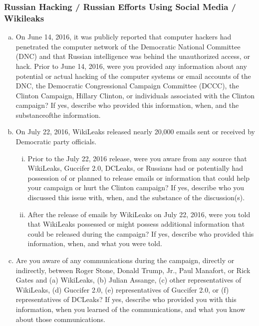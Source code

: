 \subsubsection{Russian Hacking / Russian Efforts Using Social Media / Wikileaks}

\begin{enumerate}[a.]

\item On June 14, 2016, it was publicly reported that computer hackers had penetrated the computer network of the Democratic National Committee (DNC) and that Russian intelligence was behind the unauthorized access, or hack.
Prior to June 14, 2016, were you provided any information about any potential or actual hacking of the computer systems or email accounts of the DNC, the Democratic Congressional Campaign Committee (DCCC), the Clinton Campaign, Hillary Clinton, or individuals associated with the Clinton campaign?
If yes, describe who provided this information, when, and the substanceofthe information.

\item On July 22, 2016, WikiLeaks released nearly 20,000 emails sent or received by Democratic party officials.

\begin{enumerate}[i.]

\item Prior to the July 22, 2016 release, were you aware from any source that WikiLeaks, Guccifer 2.0, DCLeaks, or Russians had or potentially had possession of or planned to release emails or information that could help your campaign or hurt the Clinton campaign?
If yes, describe who you discussed this issue with, when, and the substance of the discussion(s).

\item After the release of emails by WikiLeaks on July 22, 2016, were you told that WikiLeaks possessed or might possess additional information that could be released during the campaign?
If yes, describe who provided this information, when, and what you were told.

\end{enumerate}

\item Are you aware of any communications during the campaign, directly or indirectly, between Roger Stone, Donald Trump, Jr., Paul Manafort, or Rick Gates and (a) WikiLeaks, (b) Julian Assange, (c) other representatives of WikiLeaks, (d) Guccifer 2.0, (e) representatives of Guccifer 2.0, or (f) representatives of DCLeaks?
If yes, describe who provided you with this information, when you learned of the communications, and what you know about those communications.


\end{enumerate}
